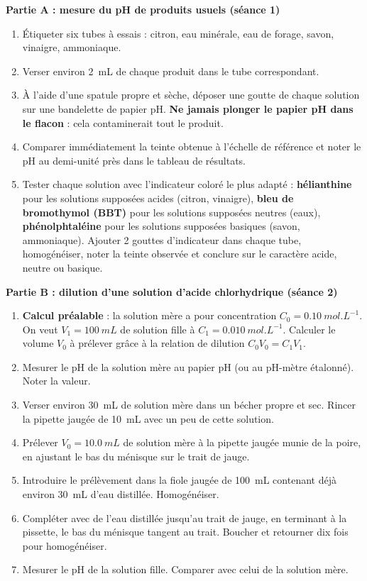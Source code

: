 \documentclass[11pt]{article}
\newcounter{popsec}
\newcounter{popsub}
\newcommand{\courssub}[1]{%
  \stepcounter{popsub}%
  \par\vspace{9pt}\noindent{\popxbold\fontsize{11.5}{13}\selectfont\color{popink}{\color{poporange}\thepopsec.\thepopsub}\hspace{6pt}#1}\par\nopagebreak\vspace{4pt}
}
\begin{document}
\courssub{Protocole}

\textbf{Partie A : mesure du pH de produits usuels (séance 1)}\par

\begin{enumerate}
\item Étiqueter six tubes à essais : citron, eau minérale, eau de forage, savon, vinaigre, ammoniaque.
\item Verser environ \SI{2}{mL} de chaque produit dans le tube correspondant.
\item À l'aide d'une spatule propre et sèche, déposer une goutte de chaque solution sur une bandelette de papier pH. \textbf{Ne jamais plonger le papier pH dans le flacon} : cela contaminerait tout le produit.
\item Comparer immédiatement la teinte obtenue à l'échelle de référence et noter le pH au demi-unité près dans le tableau de résultats.
\item Tester chaque solution avec l'indicateur coloré le plus adapté : \textbf{hélianthine} pour les solutions supposées acides (citron, vinaigre), \textbf{bleu de bromothymol (BBT)} pour les solutions supposées neutres (eaux), \textbf{phénolphtaléine} pour les solutions supposées basiques (savon, ammoniaque). Ajouter 2 gouttes d'indicateur dans chaque tube, homogénéiser, noter la teinte observée et conclure sur le caractère acide, neutre ou basique.
\end{enumerate}

\textbf{Partie B : dilution d'une solution d'acide chlorhydrique (séance 2)}\par

\begin{enumerate}
\item \textbf{Calcul préalable} : la solution mère a pour concentration $C_0 = \SI{0,10}{mol.L^{-1}}$. On veut $V_1 = \SI{100}{mL}$ de solution fille à $C_1 = \SI{0,010}{mol.L^{-1}}$. Calculer le volume $V_0$ à prélever grâce à la relation de dilution $C_0 V_0 = C_1 V_1$.
\item Mesurer le pH de la solution mère au papier pH (ou au pH-mètre étalonné). Noter la valeur.
\item Verser environ \SI{30}{mL} de solution mère dans un bécher propre et sec. Rincer la pipette jaugée de \SI{10}{mL} avec un peu de cette solution.
\item Prélever $V_0 = \SI{10,0}{mL}$ de solution mère à la pipette jaugée munie de la poire, en ajustant le bas du ménisque sur le trait de jauge.
\item Introduire le prélèvement dans la fiole jaugée de \SI{100}{mL} contenant déjà environ \SI{30}{mL} d'eau distillée. Homogénéiser.
\item Compléter avec de l'eau distillée jusqu'au trait de jauge, en terminant à la pissette, le bas du ménisque tangent au trait. Boucher et retourner dix fois pour homogénéiser.
\item Mesurer le pH de la solution fille. Comparer avec celui de la solution mère.
\end{enumerate}
\end{document}
